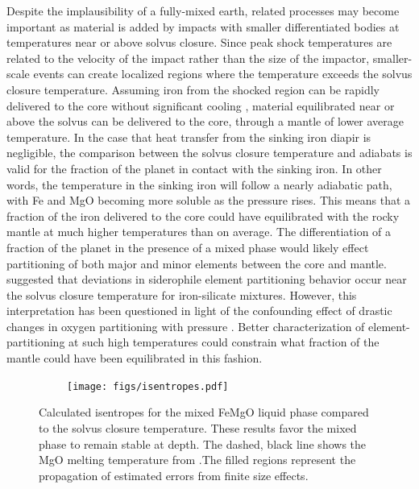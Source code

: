 Despite the implausibility of a fully-mixed earth, related processes may become important
as material is added by impacts with smaller differentiated bodies at temperatures near
or above solvus closure. Since peak shock temperatures are related to the velocity of the
impact rather than the size of the impactor, smaller-scale events can create localized
regions where the temperature exceeds the solvus closure temperature.  Assuming iron from
the shocked region can be rapidly delivered to the core without significant cooling
\citep{Monteux2009}, material equilibrated near or above the solvus can be delivered to
the core, through a mantle of lower average temperature. In the case that heat transfer
from the sinking iron diapir is negligible, the comparison between the solvus closure
temperature and adiabats is valid for the fraction of the planet in contact with the
sinking iron. In other words, the temperature in the sinking iron will follow a nearly
adiabatic path, with Fe and MgO becoming more soluble as the pressure rises. This means
that a fraction of the iron delivered to the core could have equilibrated with the rocky
mantle at much higher temperatures than on average. The differentiation of a fraction of
the planet in the presence of a mixed phase would likely effect partitioning of both major
and minor elements between the core and mantle. \cite{Walker1993}
suggested that deviations in siderophile element partitioning behavior occur near the
solvus closure temperature for iron-silicate mixtures. However, this interpretation has
been questioned in light of the confounding effect of drastic changes in oxygen partitioning
with pressure \citep{Frost2010}. Better characterization of element-partitioning at such
high temperatures could constrain what fraction of the mantle could have been
equilibrated in this fashion.

\begin{figure}[h!]  
  \centering
    \texttt{[image: figs/isentropes.pdf]}  
\caption{Calculated isentropes for the mixed FeMgO liquid phase compared to the solvus
  closure temperature. These results favor the mixed phase to remain stable at depth. The
  dashed, black line shows the MgO melting temperature from \citep{Boates2013}.The filled
  regions represent the propagation of estimated errors from finite size effects.}
\label{fig:isentropes}
\end{figure}


